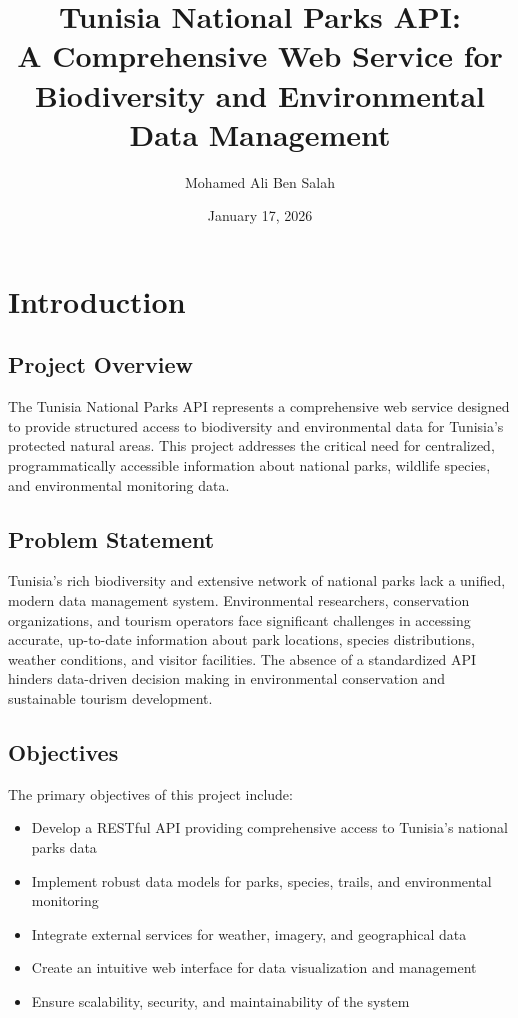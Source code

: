 \documentclass[12pt,a4paper]{report}
\title{Tunisia National Parks API: \\ A Comprehensive Web Service for Biodiversity and Environmental Data Management}
\author{Mohamed Ali Ben Salah}
\date{January 17, 2026}
\begin{document}
\maketitle

\tableofcontents
\newpage

\chapter{Introduction}

\section{Project Overview}

The Tunisia National Parks API represents a comprehensive web service designed to provide structured access to biodiversity and environmental data for Tunisia's protected natural areas. This project addresses the critical need for centralized, programmatically accessible information about national parks, wildlife species, and environmental monitoring data.

\section{Problem Statement}

Tunisia's rich biodiversity and extensive network of national parks lack a unified, modern data management system. Environmental researchers, conservation organizations, and tourism operators face significant challenges in accessing accurate, up-to-date information about park locations, species distributions, weather conditions, and visitor facilities. The absence of a standardized API hinders data-driven decision making in environmental conservation and sustainable tourism development.

\section{Objectives}

The primary objectives of this project include:

\begin{itemize}
    \item Develop a RESTful API providing comprehensive access to Tunisia's national parks data
    \item Implement robust data models for parks, species, trails, and environmental monitoring
    \item Integrate external services for weather, imagery, and geographical data
    \item Create an intuitive web interface for data visualization and management
    \item Ensure scalability, security, and maintainability of the system
\end{itemize}
\end{document}
